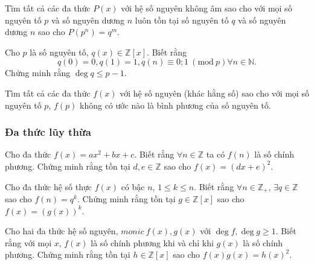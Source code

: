 \begin{bt}
Tìm tất cả các đa thức $P(x)$ với hệ số nguyên không âm sao cho với mọi số nguyên tố $p$ và số nguyên dương $n$ luôn tồn tại số nguyên tố $q$ và số nguyên dương $n$ sao cho $P\left (p^n\right )=q^m$. 
\end{bt}

\begin{bt}
Cho $p$ là số nguyên tố, $q(x) \in \mathbb{Z}[x]$. Biết rằng $$q(0)=0, q(1)=1,  q(n)\equiv 0;1 ~\left (\mathrm{mod~} p\right ) \forall n \in \mathbb{N}.$$
Chứng minh rằng $\deg q \leq p-1$.  
\end{bt}

\begin{bt}
Tìm tất cả các đa thức $f(x)$ với hệ số nguyên (khác hằng số) sao cho với mọi số nguyên tố $p$, $f(p)$ không có ước nào là bình phương của số nguyên tố.
\end{bt}
\subsubsection{Đa thức lũy thừa}
\begin{bt}
Cho đa thức $f(x)=ax^2+bx+c$. Biết rằng $\forall n \in \mathbb{Z}$ ta có $f(n)$ là số chính phương. Chứng minh rằng tồn tại $d,e \in  \mathbb{Z}$ sao cho $f(x)=(dx+e)^2$. 
\end{bt}

\begin{bt}
Cho đa thức hệ số thực $f(x)$ có bậc $n$, $1\leq k \leq n$. Biết rằng $\forall n \in \mathbb{Z}_{+}$, $\exists q \in \mathbb{Z}$  sao cho $f(n)=q^k$. Chứng minh rằng tồn tại $g \in \mathbb{Z}[x]$ sao cho $f(x)=(g(x))^k$. 
\end{bt}

\begin{bt}
Cho hai đa thức hệ số nguyên, $monic~ f(x),g(x)$ với $\deg f, \deg g \geq 1$. Biết rằng với mọi $x$, $f(x)$  là số chính phương khi và chỉ khi $g(x)$ là số chính phương. Chứng minh rằng tồn tại $h \in \mathbb{Z}[x]$ sao cho $f(x)g(x) =h(x)^2$. 
\end{bt}

